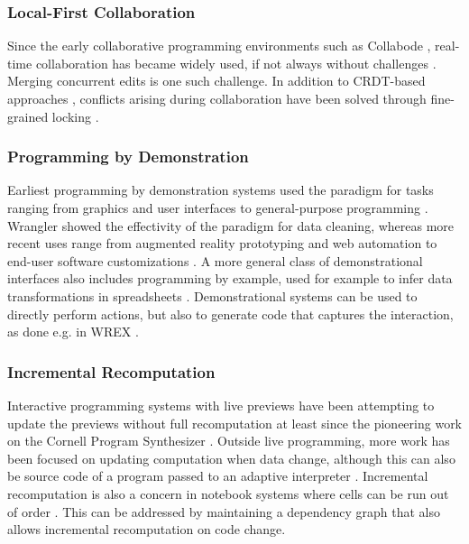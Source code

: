 \documentclass[sigconf,anonymous,screen]{acmart}
\begin{document}
\subsubsection*{Local-First Collaboration}
Since the early collaborative programming environments such as Collabode \cite{goldman-2011-collaborative},
real-time collaboration has became widely used, if not always without challenges \cite{tan-2024-vslive}.
Merging concurrent edits is one such challenge.
In addition to CRDT-based approaches \cite{klokmose-2024-mywebstrates}, conflicts arising during
collaboration have been solved through fine-grained locking \cite{wang-2024-nbconflicts}.

\subsubsection*{Programming by Demonstration}
Earliest programming by demonstration systems used the paradigm for tasks ranging from graphics
and user interfaces to general-purpose programming \cite{smith-1975-pygmalion,cypher-1993-pbd}.
Wrangler \cite{kandel-2011-wrangler} showed the effectivity of the paradigm for data cleaning,
whereas more recent uses range from augmented reality prototyping \cite{leiva-2021-rapido}
and web automation \cite{chen-2023-miwa} to end-user software customizations
\cite{litt-2020-customization,litt-2020-wildcard}. A more general class of demonstrational
interfaces \cite{myers-2000-demonstrational} also includes programming by example, used
for example to infer data transformations in spreadsheets \cite{gulwani-2012-spreadsheets}.
Demonstrational systems can be used to directly perform actions, but also to generate code
that captures the interaction, as done e.g. in WREX \cite{drossos-2020-wrex}.

\subsubsection*{Incremental Recomputation}
Interactive programming systems with live previews \cite{petricek-2020-live,mcdirmid-2013-usable}
have been attempting to update the previews without full recomputation at least since the pioneering
work on the Cornell Program Synthesizer \cite{teitelbaum-1981-cps}. Outside live programming,
more work has been focused on updating computation when data change, although this can also
be source code of a program passed to an adaptive interpreter \cite{acar-2006-adaptive}.
Incremental recomputation is also a concern in notebook systems where cells can be run out of
order \cite{singer-2020-jollity}. This can be addressed by maintaining a dependency graph
\cite{petricek-2018-wrattler,koop-2017-dataflow} that also allows incremental recomputation
on code change.
\end{document}
